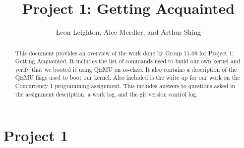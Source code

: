 \documentclass[journal, letterpaper, draftclsnofoot, onecolumn, 10pt]{IEEEtran}
\begin{document}
\title{Project 1: Getting Acquainted}
\author{Leon Leighton, Alec Merdler, and Arthur Shing}

\begin{titlepage}
    \centering
    \maketitle
    \begin{abstract}
      This document provides an overview of the work done by Group 11-09 for Project 1: Getting Acquainted.
      It includes the list of commands used to build our own kernel and verify that we booted it using QEMU on os-class.
      It also contains a description of the QEMU flags used to boot our kernel.
      Also included is the write up for our work on the Concurrency 1 programming assignment.
      This includes answers to questions asked in the assignment description, a work log, and the git version control log.
    \end{abstract}


\end{titlepage}
\tableofcontents
\clearpage


\section{Project 1}
\end{document}
